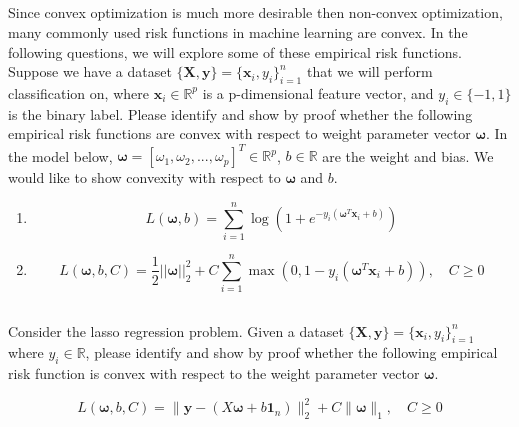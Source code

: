 \documentclass{exam}
\begin{document}
\subsection{}
Since convex optimization is much more desirable then non-convex optimization, many commonly used risk functions in machine learning are convex. In the following questions, we will explore some of these empirical risk functions. 
\\
Suppose we have a dataset $\{\bm{X}, \bm{y}\} = \{\bm{x}_i, y_i\}_{i=1}^n$ that we will perform classification on, where $\bm{x}_i \in \mathbb{R}^p$ is a p-dimensional feature vector, and $y_i \in \{-1, 1\}$ is the binary label. 
Please identify and show by proof whether the following empirical risk functions are convex with respect to weight parameter vector $\bm{\omega}$. In the model below, $\bm{\omega} = [\omega_1, \omega_2, ..., \omega_p]^T \in \mathbb{R}^p$, $b\in \mathbb{R}$ are the weight and bias. We would like to show convexity with respect to $\bm{\omega}$ and $b$. 

\begin{enumerate}[label=(\alph*)]
    \item 
    \begin{equation*}
        L(\bm{\omega}, b) = \sum_{i=1}^n \log(1+e^{-y_i(\bm{\omega}^T \bm{x}_i + b)})
    \end{equation*}
    
    \item 
    \begin{equation*}
         L(\bm{\omega}, b, C) = \frac{1}{2} ||\bm{\omega}||^2_2 + C \sum_{i=1}^n \max(0, 1-y_i(\bm{\omega}^T \bm{x}_i + b)), \quad C\geq0
    \end{equation*}
\end{enumerate}




\subsection{}
Consider the lasso regression problem. Given a dataset $\{\bm{X}, \bm{y}\} = \{\bm{x}_i, y_i\}_{i=1}^n$ where $y_i \in \mathbb{R}$, please identify and show by proof whether the following empirical risk function is convex with respect to the weight parameter vector $\bm{\omega}$. 

\begin{equation*}
     L(\bm{\omega}, b, C) = \|\bm{y} -(X\bm{\omega} + b \bm{1}_n)\|^2_2 + C \|\bm{\omega}\|_1, \quad C\geq 0
\end{equation*}
\end{document}
